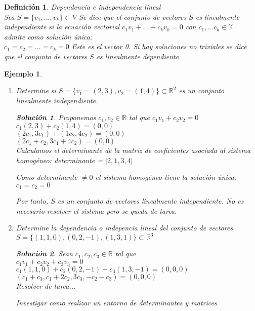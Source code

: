 \documentclass{IEEEtran}
\newcommand{\mb}[1]{\mathbb{#1}}
\newtheorem{defin}{Definici\'{o}n}
\newtheorem{solu}{Soluci\'{o}n}
\newtheorem{ejem}{Ejemplo}
\begin{document}
\begin{defin} Dependencia e independencia lineal \\
	Sea $S = \{v_1,...,v_k\}\subset V$ Se dice que el conjunto de vectores $S$ es linealmente independiente si la ecuaci\'{o}n vectorial $c_1v_1+...+c_kv_k=0$
	con $c_1,...c_k \in \mb{K}$\\
	admite como soluci\'{o}n \'{u}nica:\\
	$c_1=c_2=...=c_k=0$ Este es el vector 0.
	Si hay soluciones no triviales se dice que el conjunto de vectores $S$ es linealmente dependiente.
	
\end{defin}

\begin{ejem}

\begin{enumerate}
	\item Determine si $S = \{v_1=(2,3),v_2=(1,4)\}\subset \mb{R}^2$ es un conjunto linealmente independiente.

\begin{solu}
Proponemos $c_1,c_2 \in \mb{R}$ tal que $c_1v_1 + c_2v_2 = 0$\\
$c_1(2,3)+c_2(1,4)=(0,0)$\\
$(2c_1,3c_1)+(1c_2,4c_2)=(0,0)$\\
$(2c_1 + c_2 ,3c_1+4c_2)=(0,0)$\\


Calculamos el determinante de la matriz de coeficientes asociada al sistema homog\'{e}neo:
determinante = $\left | 2 , 1  , 3, 4	\right |$

Como determinante $\neq 0$ el sistema homog\'{e}neo tiene la soluci\'{o}n \'{u}nica: 
$c_1 = c_2 = 0 $

Por tanto, $S$ es un conjunto de vectores linealmente independiente. No es necesario resolver el sistema pero se queda de tarea. 
\end{solu}

\item Determine la dependencia o indepencia lineal del conjunto de vectores $S=\{(1,1,0),(0,2,-1),(1,3,1)\} \subset \mb{R}^3$


\begin{solu}
	Sean $c_1,c_2,c_3 \in \mb{R}$ tal que\\
	$c_1v_1+c_2v_2+c_3v_3 = 0 $\\
	$c_1(1,1,0)+c_2(0,2,-1)+c_3(1,3,-1)=(0,0,0) $\\
	$(c_1+c_3,c_1+2c_2,3c_3,-c_2 -c_3)=(0,0,0) $\\

	Resolver de tarea...

	Investigar como realizar un entorno de determinantes y matrices

\end{solu}

\end{enumerate}
\end{ejem}
\end{document}

